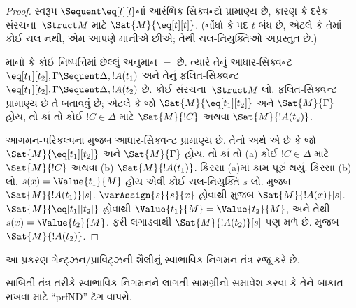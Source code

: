 \begin{proof}
સ્વરૂપ ${} \Sequent \eq[t][t]$નાં આરંભિક સિક્વન્ટો પ્રામાણ્ય છે, કારણ
કે દરેક સંરચના~$\Struct M$ માટે $\Sat{M}{\eq[t][t]}$. (નોંધો કે
પદ $t$ બંધ છે, એટલે કે તેમાં કોઈ ચલ નથી, એમ આપણે માનીએ છીએ; તેથી
ચલ-નિયુક્તિઓ અપ્રસ્તુત છે.)

માનો કે કોઈ નિષ્પત્તિમાં છેલ્લું અનુમાન $=$ છે. ત્યારે તેનું
આધાર-સિક્વન્ટ $\eq[t_1][t_2], \Gamma \Sequent \Delta, !A(t_1)$ અને
તેનું ફલિત-સિક્વન્ટ
$\eq[t_1][t_2], \Gamma \Sequent \Delta, !A(t_2)$ છે. કોઈ
સંરચના~$\Struct M$ લો. ફલિત-સિક્વન્ટ પ્રામાણ્ય છે તે બતાવવું છે;
એટલે કે જો $\Sat{M}{\eq[t_1][t_2]}$ અને $\Sat{M}{\Gamma}$ હોય, તો કાં
તો કોઈ $!C \in \Delta$ માટે $\Sat{M}{!C}$ અથવા $\Sat{M}{!A(t_2)}$.

આગમન-પરિકલ્પના મુજબ આધાર-સિક્વન્ટ પ્રામાણ્ય છે. તેનો અર્થ એ છે કે જો
$\Sat{M}{\eq[t_1][t_2]}$ અને $\Sat{M}{\Gamma}$ હોય, તો કાં તો
(a) કોઈ $!C \in \Delta$ માટે $\Sat{M}{!C}$ અથવા
(b) $\Sat{M}{!A(t_1)}$. કિસ્સા (a)માં કામ પૂરું થયું. કિસ્સા (b) લો.
$s(x) = \Value{t_1}{M}$ હોય એવી કોઈ ચલ-નિયુક્તિ $s$ લો.
 મુજબ
$\Sat{M}{!A(t_1)}[s]$. $\varAssign{s}{s}{x}$ હોવાથી
 મુજબ $\Sat{M}{!A(x)}[s]$.
$\Sat{M}{\eq[t_1][t_2]}$ હોવાથી
$\Value{t_1}{M} = \Value{t_2}{M}$, અને તેથી
$s(x) = \Value{t_2}{M}$.  ફરી
લગાડવાથી $\Sat{M}{!A(t_2)}[s]$ પણ મળે છે.
 મુજબ $\Sat{M}{!A(t_2)}$.
\end{proof}
\endgroup


\OLEndChapterHook
\endgroup


%
  \begingroup
\makeatletter{}\makeatother

\label{guunit:OLP-0084}

\begin{editorial}
આ પ્રકરણ ગેન્ટ્ઝન/પ્રાવિટ્ઝની શૈલીનું સ્વાભાવિક નિગમન તંત્ર રજૂ કરે છે.

સાબિતી-તંત્ર તરીકે સ્વાભાવિક નિગમનને લાગતી સામગ્રીનો સમાવેશ કરવા કે
તેને બાકાત રાખવા માટે ``prfND'' ટૅગ વાપરો.
\end{editorial}

\begingroup
\makeatletter{}\makeatother


\label{guunit:OLP-0085}


